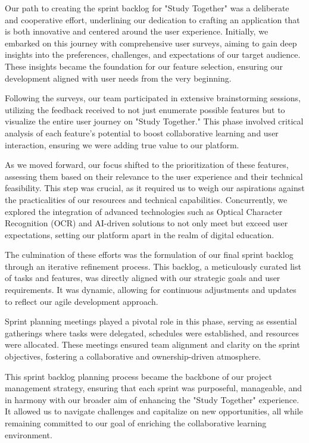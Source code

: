 Our path to creating the sprint backlog for "Study Together" was a deliberate and cooperative effort, underlining our dedication to crafting an application that is both innovative and centered around the user experience. Initially, we embarked on this journey with comprehensive user surveys, aiming to gain deep insights into the preferences, challenges, and expectations of our target audience. These insights became the foundation for our feature selection, ensuring our development aligned with user needs from the very beginning.

Following the surveys, our team participated in extensive brainstorming sessions, utilizing the feedback received to not just enumerate possible features but to visualize the entire user journey on "Study Together." This phase involved critical analysis of each feature's potential to boost collaborative learning and user interaction, ensuring we were adding true value to our platform.

As we moved forward, our focus shifted to the prioritization of these features, assessing them based on their relevance to the user experience and their technical feasibility. This step was crucial, as it required us to weigh our aspirations against the practicalities of our resources and technical capabilities. Concurrently, we explored the integration of advanced technologies such as Optical Character Recognition (OCR) and AI-driven solutions to not only meet but exceed user expectations, setting our platform apart in the realm of digital education.

The culmination of these efforts was the formulation of our final sprint backlog through an iterative refinement process. This backlog, a meticulously curated list of tasks and features, was directly aligned with our strategic goals and user requirements. It was dynamic, allowing for continuous adjustments and updates to reflect our agile development approach.

Sprint planning meetings played a pivotal role in this phase, serving as essential gatherings where tasks were delegated, schedules were established, and resources were allocated. These meetings ensured team alignment and clarity on the sprint objectives, fostering a collaborative and ownership-driven atmosphere.

This sprint backlog planning process became the backbone of our project management strategy, ensuring that each sprint was purposeful, manageable, and in harmony with our broader aim of enhancing the "Study Together" experience. It allowed us to navigate challenges and capitalize on new opportunities, all while remaining committed to our goal of enriching the collaborative learning environment.

